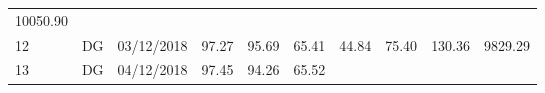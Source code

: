 \documentclass[
  11pt,
]{article}
\begin{document}
\begin{longtable}[]{@{}llllllllll@{}}
\begin{minipage}[t]{0.08\columnwidth}
10050.90\strut
\end{minipage}\tabularnewline
\begin{minipage}[t]{0.04\columnwidth}\raggedright
12\strut
\end{minipage} & \begin{minipage}[t]{0.09\columnwidth}\raggedright
DG\strut
\end{minipage} & \begin{minipage}[t]{0.10\columnwidth}\raggedright
03/12/2018\strut
\end{minipage} & \begin{minipage}[t]{0.06\columnwidth}\raggedright
97.27\strut
\end{minipage} & \begin{minipage}[t]{0.06\columnwidth}\raggedright
95.69\strut
\end{minipage} & \begin{minipage}[t]{0.06\columnwidth}\raggedright
65.41\strut
\end{minipage} & \begin{minipage}[t]{0.06\columnwidth}\raggedright
44.84\strut
\end{minipage} & \begin{minipage}[t]{0.06\columnwidth}\raggedright
75.40\strut
\end{minipage} & \begin{minipage}[t]{0.13\columnwidth}\raggedright
130.36\strut
\end{minipage} & \begin{minipage}[t]{0.08\columnwidth}\raggedright
9829.29\strut
\end{minipage}\tabularnewline
\begin{minipage}[t]{0.04\columnwidth}\raggedright
13\strut
\end{minipage} & \begin{minipage}[t]{0.09\columnwidth}\raggedright
DG\strut
\end{minipage} & \begin{minipage}[t]{0.10\columnwidth}\raggedright
04/12/2018\strut
\end{minipage} & \begin{minipage}[t]{0.06\columnwidth}\raggedright
97.45\strut
\end{minipage} & \begin{minipage}[t]{0.06\columnwidth}\raggedright
94.26\strut
\end{minipage} & \begin{minipage}[t]{0.06\columnwidth}\raggedright
65.52\strut
\end{minipage} & \begin{minipage}[t]{0.06\columnwidth}\raggedright

\end{minipage}
\end{longtable}
\end{document}
